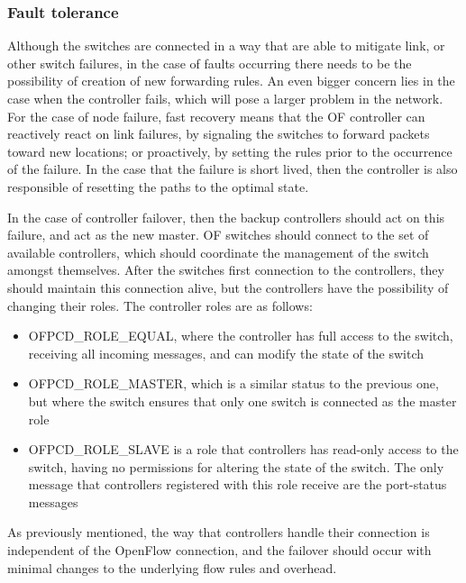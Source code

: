 \subsubsection {Fault tolerance}

Although the switches are connected in a way that are able to mitigate link, or other switch failures, in the case of faults occurring there needs to be the possibility of creation of new forwarding rules. An even bigger 
concern lies in the case when the controller fails, which will pose a larger problem in the network. For the case of node failure, fast recovery means that the OF controller can reactively react on link failures, by signaling the
switches to forward packets toward new locations; or proactively, by setting the rules prior to the occurrence of the failure. In the case that the failure is short lived, then the controller is also responsible of resetting the 
paths to the optimal state.
\par In the case of controller failover, then the backup controllers should act on this failure, and act as the new master. OF switches should connect to the set of available controllers, which should coordinate the management of 
the switch amongst themselves. After the switches first connection to the controllers, they should maintain this connection alive, but the controllers have the possibility of changing their roles. The controller roles are as follows:

\begin {itemize}
    \item \textsc {OFPCD\_ROLE\_EQUAL}, where the controller has full access to the switch, receiving all incoming messages, and can modify the state of the switch
    \item \textsc {OFPCD\_ROLE\_MASTER}, which is a similar status to the previous one, but where the switch ensures that only one switch is connected as the master role
    \item \textsc {OFPCD\_ROLE\_SLAVE} is a role that controllers has read-only access to the switch, having no permissions for altering the state of the switch. The only message that controllers registered with this role receive
        are the port-status messages
\end {itemize}

As previously mentioned, the way that controllers handle their connection is independent of the OpenFlow connection, and the failover should occur with minimal changes to the underlying flow rules and overhead.


